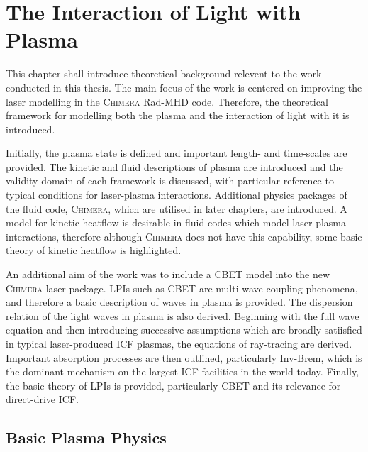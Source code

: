 \chapter{The Interaction of Light with Plasma}%
\label{chap:Theory}

This chapter shall introduce theoretical background relevent to the work conducted in this thesis.
The main focus of the work is centered on improving the laser modelling in the \textsc{Chimera} \ac{Rad-MHD} code.
Therefore, the theoretical framework for modelling both the plasma and the interaction of light with it is introduced.

Initially, the plasma state is defined and important length- and time-scales are provided.
The kinetic and fluid descriptions of plasma are introduced and the validity domain of each framework is discussed, with particular reference to typical conditions for laser-plasma interactions.
Additional physics packages of the fluid code, \textsc{Chimera}, which are utilised in later chapters, are introduced.
A model for kinetic heatflow is desirable in fluid codes which model laser-plasma interactions, therefore although \textsc{Chimera} does not have this capability, some basic theory of kinetic heatflow is highlighted.

An additional aim of the work was to include a \ac{CBET} model into the new \textsc{Chimera} laser package.
\ac{LPIs} such as \ac{CBET} are multi-wave coupling phenomena, and therefore a basic description of waves in plasma is provided.
The dispersion relation of the light waves in plasma is also derived.
Beginning with the full wave equation and then introducing successive assumptions which are broadly satiisfied in typical laser-produced \ac{ICF} plasmas, the equations of ray-tracing are derived.
Important absorption processes are then outlined, particularly \ac{Inv-Brem}, which is the dominant mechanism on the largest \ac{ICF} facilities in the world today.
Finally, the basic theory of \ac{LPIs} is provided, particularly \ac{CBET} and its relevance for direct-drive \ac{ICF}.

\newpage

\section{Basic Plasma Physics}%
\label{sec:theory_plasma_phys}

